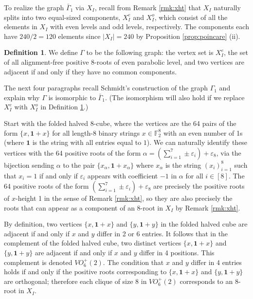 \documentclass[11pt]{amsart}
\theoremstyle{plain}
\theoremstyle{definition}
\newtheorem{defn}[theorem]{Definition}
\theoremstyle{remark}
\numberwithin{equation}{subsection}
\newcommand{\al}{\alpha}
\newcommand{\ep}{\varepsilon}
\newcommand{\abs}[1]{\lvert #1 \rvert}
\begin{document}
To realize the graph $\bar\Gamma_1$ via $X_I$, recall from Remark \ref{rmk:xht}
that $X_I$ naturally splits into two equal-sized components, $X_I^e$ and
$X_I^o$, which consist of all the elements in $X_I$ with even levels and odd
levels, respectively. The components each have $240/2=120$ elements since
$\abs{X_I}=240$ by Proposition \ref{prop:poincare} (ii).
\begin{defn}
    \label{def:Gamma} We define $\Gamma$ to be the following graph: the vertex
          set is $X_I^e$, the set of all alignment-free positive $8$-roots of
          even parabolic level, and two vertices are adjacent if and only if
          they have no common components.
      \end{defn}
\noindent The next four paragraphs recall Schmidt's construction of the graph
         $\Gamma_1$ and explain why $\Gamma$ is isomorphic to $\bar\Gamma_1$.
         (The isomorphism will also hold if we replace $X_I^e$ with $X_I^o$ in
         Definition \ref{def:Gamma}.)

Start with the folded halved 8-cube, where the vertices are the 64 pairs of the
form $\{x,\mathbf{1}+x\}$ for all length-8 binary strings $x\in \mathbb{F}_2^8$
with an even number of 1s (where $\mathbf{1}$ is the string with all entries
equal to $1$). We can naturally identify these vertices with the 64 positive
roots of the form $\al=(\sum_{i=1}^7\pm\ep_i)+\ep_8$, via the bijection sending
$\al$ to the pair $\{x_\al,\mathbf{1}+x_\al\}$ where $x_\al$ is the string
$(x_i)_{i=1}^8$ such that $x_i=1$ if and only if $\ep_i$ appears with
coefficient $-1$ in $\al$ for all $i\in[8]$. The 64 positive roots of the form
$(\sum_{i=1}^7\pm\ep_i)+\ep_8$  are precisely the positive roots of $x$-height 1
in the sense of Remark \ref{rmk:xht}, so they are also precisely the roots that
can appear as a component of an 8-root in $X_I$ by Remark \ref{rmk:xht}.

By definition, two vertices $\{x,\mathbf{1}+x\}$ and $\{y,\mathbf{1}+y\}$ in the
folded halved cube are adjacent if and only if $x$ and $y$ differ in 2 or 6
entries. It follows that in the complement of the folded halved cube, two
distinct vertices $\{x,\mathbf{1}+x\}$ and $\{y,\mathbf{1}+y\}$ are adjacent if
and only if $x$ and $y$ differ in 4 positions. This complement is denoted
$VO_6^+(2)$. The condition that $x$ and $y$ differ in 4 entries holds if and
only if the positive roots corresponding to $\{x,\mathbf{1}+x\}$ and
$\{y,\mathbf{1}+y\}$  are orthogonal; therefore each clique of size 8 in
$VO_6^+(2)$ corresponds to an 8-root in $X_I$.
\end{document}
